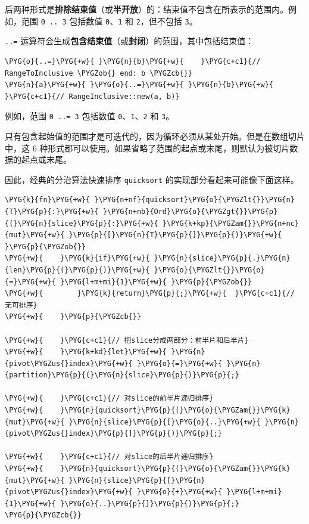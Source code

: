 后两种形式是\textbf{排除结束值}（或\textbf{半开放}）的：结束值不包含在所表示的范围内。例如，范围 \texttt{0 .. 3} 包括数值 \texttt{0}、\texttt{1} 和 \texttt{2}，但不包括 \texttt{3}。

\texttt{..=} 运算符会生成\textbf{包含结束值}（或\textbf{封闭}）的范围，其中包括结束值：

\begin{Verbatim}[commandchars=\\\{\},breaklines=true,breakanywhere=true,fontsize=\codefont,xleftmargin=17bp]
\PYG{o}{..=}\PYG{+w}{ }\PYG{n}{b}\PYG{+w}{    }\PYG{c+c1}{// RangeToInclusive \PYGZob{} end: b \PYGZcb{}}
\PYG{n}{a}\PYG{+w}{ }\PYG{o}{..=}\PYG{+w}{ }\PYG{n}{b}\PYG{+w}{  }\PYG{c+c1}{// RangeInclusive::new(a, b)}
\end{Verbatim}

例如，范围 \texttt{0 ..= 3} 包括数值 \texttt{0}、\texttt{1}、\texttt{2} 和 \texttt{3}。

只有包含起始值的范围才是可迭代的，因为循环必须从某处开始。但是在数组切片中，这 6 种形式都可以使用。如果省略了范围的起点或末尾，则默认为被切片数据的起点或末尾。

因此，经典的分治算法快速排序 \texttt{quicksort} 的实现部分看起来可能像下面这样。

\begin{Verbatim}[commandchars=\\\{\},breaklines=true,breakanywhere=true,fontsize=\codefont,xleftmargin=17bp]
\PYG{k}{fn}\PYG{+w}{ }\PYG{n+nf}{quicksort}\PYG{o}{\PYGZlt{}}\PYG{n}{T}\PYG{p}{:}\PYG{+w}{ }\PYG{n+nb}{Ord}\PYG{o}{\PYGZgt{}}\PYG{p}{(}\PYG{n}{slice}\PYG{p}{:}\PYG{+w}{ }\PYG{k+kp}{\PYGZam{}}\PYG{n+nc}{mut}\PYG{+w}{ }\PYG{p}{[}\PYG{n}{T}\PYG{p}{]}\PYG{p}{)}\PYG{+w}{ }\PYG{p}{\PYGZob{}}
\PYG{+w}{    }\PYG{k}{if}\PYG{+w}{ }\PYG{n}{slice}\PYG{p}{.}\PYG{n}{len}\PYG{p}{(}\PYG{p}{)}\PYG{+w}{ }\PYG{o}{\PYGZlt{}}\PYG{o}{=}\PYG{+w}{ }\PYG{l+m+mi}{1}\PYG{+w}{ }\PYG{p}{\PYGZob{}}
\PYG{+w}{        }\PYG{k}{return}\PYG{p}{;}\PYG{+w}{  }\PYG{c+c1}{// 无可排序}
\PYG{+w}{    }\PYG{p}{\PYGZcb{}}

\PYG{+w}{    }\PYG{c+c1}{// 把slice分成两部分：前半片和后半片}
\PYG{+w}{    }\PYG{k+kd}{let}\PYG{+w}{ }\PYG{n}{pivot\PYGZus{}index}\PYG{+w}{ }\PYG{o}{=}\PYG{+w}{ }\PYG{n}{partition}\PYG{p}{(}\PYG{n}{slice}\PYG{p}{)}\PYG{p}{;}

\PYG{+w}{    }\PYG{c+c1}{// 对slice的前半片递归排序}
\PYG{+w}{    }\PYG{n}{quicksort}\PYG{p}{(}\PYG{o}{\PYGZam{}}\PYG{k}{mut}\PYG{+w}{ }\PYG{n}{slice}\PYG{p}{[}\PYG{o}{..}\PYG{+w}{ }\PYG{n}{pivot\PYGZus{}index}\PYG{p}{]}\PYG{p}{)}\PYG{p}{;}

\PYG{+w}{    }\PYG{c+c1}{// 对slice的后半片递归排序}
\PYG{+w}{    }\PYG{n}{quicksort}\PYG{p}{(}\PYG{o}{\PYGZam{}}\PYG{k}{mut}\PYG{+w}{ }\PYG{n}{slice}\PYG{p}{[}\PYG{n}{pivot\PYGZus{}index}\PYG{+w}{ }\PYG{o}{+}\PYG{+w}{ }\PYG{l+m+mi}{1}\PYG{+w}{ }\PYG{o}{..}\PYG{p}{]}\PYG{p}{)}\PYG{p}{;}
\PYG{p}{\PYGZcb{}}
\end{Verbatim}

